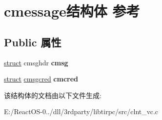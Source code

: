 \hypertarget{structcmessage}{}\section{cmessage结构体 参考}
\label{structcmessage}
\subsection*{Public 属性}
\begin{DoxyCompactItemize}
\item 
\mbox{\label{structcmessage_ae44388fb3d9f1ab94b95304f90c831fa}} 
\hyperlink{interfacestruct}{struct} cmsghdr {\bfseries cmsg}
\item 
\mbox{\label{structcmessage_abd5c54f390aab72a036edb7244201892}} 
\hyperlink{interfacestruct}{struct} \hyperlink{structcmsgcred}{cmsgcred} {\bfseries cmcred}
\end{DoxyCompactItemize}


该结构体的文档由以下文件生成\+:\begin{DoxyCompactItemize}
\item 
E\+:/\+React\+O\+S-\/0../dll/3rdparty/libtirpc/src/clnt\+\_\+vc.\+c\end{DoxyCompactItemize}
